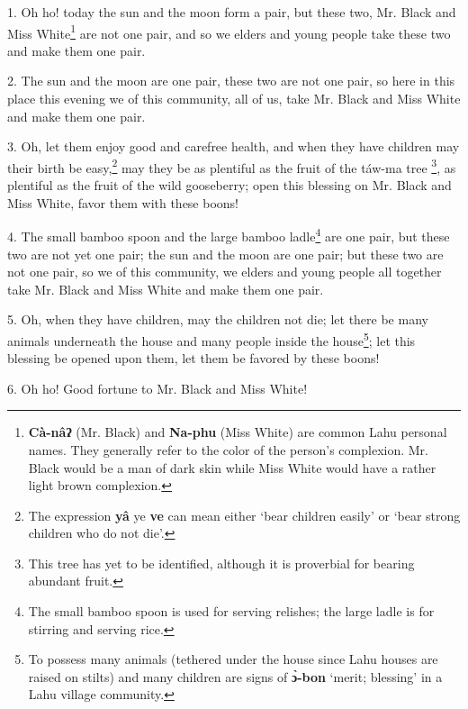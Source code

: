 \setcounter{footnote}{0}

1. Oh ho! today the sun and the moon form a pair, but these two, Mr. Black and Miss
White\footnote{\textbf{Cà-nâʔ} (Mr. Black) and \textbf{Na-phu} (Miss White) are common Lahu personal names. They generally refer to the color of the person's complexion. Mr. Black would be a man of dark skin while Miss White would have a rather light brown complexion.} are not one pair, and so we elders and young people take these two and
make them one pair.

2. The sun and the moon are one pair, these two are not one pair, so here in this
place this evening we of this community, all of us, take Mr. Black and Miss White
and make them one pair.

3. Oh, let them enjoy good and carefree health, and when they have children may
their birth be easy,\footnote{The expression \textbf{yâ} ye \textbf{ve} can mean either `bear children easily' or `bear strong children who do not die'.} may they be as plentiful as the fruit of the táw-ma tree
\footnote{This tree has yet to be identified, although it is proverbial for bearing abundant fruit.}, as plentiful as the fruit of the wild gooseberry; open this blessing on Mr.
Black and Miss White, favor them with these boons!

4. The small bamboo spoon and the large bamboo ladle\footnote{The small bamboo spoon is used for serving relishes; the large ladle is for stirring and serving rice.} are one pair, but these
two are not yet one pair; the sun and the moon are one pair; but these two are
not one pair, so we of this community, we elders and young people all together
take Mr. Black and Miss White and make them one pair.

5. Oh, when they have children, may the children not die; let there be many animals
underneath the house and many people inside the house\footnote{To possess many animals (tethered under the house since Lahu houses are raised on stilts) and many children are signs of \textbf{ɔ̀-bon} `merit; blessing' in a Lahu village community.}; let this blessing be
opened upon them, let them be favored by these boons!

6. Oh ho! Good fortune to Mr. Black and Miss White!

